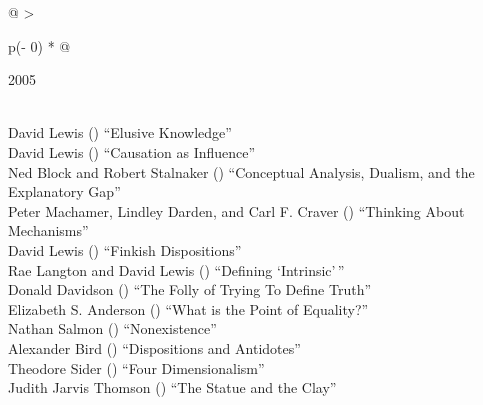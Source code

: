 \documentclass[
  10pt,
  letterpaper,
  DIV=11,
  numbers=noendperiod,
  twoside]{scrartcl}
\begin{document}
\begin{longtable}[]{@{}
  >{\raggedright\arraybackslash}p{(\columnwidth - 0\tabcolsep) * }@{}}

\caption{\label{tbl-top-ten-1996}Most cited articles published less than
ten years ago as of 2005.}

\tabularnewline

\toprule\noalign{}
\begin{minipage}[b]{\linewidth}\raggedright
2005
\end{minipage} \\
\midrule\noalign{}
\endhead
\bottomrule\noalign{}
\endlastfoot
David Lewis
()
``Elusive Knowledge'' \\
David Lewis
()
``Causation as Influence'' \\
Ned Block and Robert Stalnaker
()
``Conceptual Analysis, Dualism, and the Explanatory Gap'' \\
Peter Machamer, Lindley Darden, and Carl F. Craver
()
``Thinking About Mechanisms'' \\
David Lewis
()
``Finkish Dispositions'' \\
Rae Langton and David Lewis
()
``Defining `Intrinsic'\,'' \\
Donald Davidson
()
``The Folly of Trying To Define Truth'' \\
Elizabeth S. Anderson
()
``What is the Point of Equality?'' \\
Nathan Salmon
()
``Nonexistence'' \\
Alexander Bird
()
``Dispositions and Antidotes'' \\
Theodore Sider
()
``Four Dimensionalism'' \\
Judith Jarvis Thomson
()
``The Statue and the Clay'' \\

\end{longtable}
\end{document}
